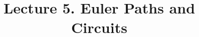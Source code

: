 \documentclass[aspectratio=169]{beamer}
\begin{document}
 

\newcommand{\Cov}{\mathrm{Cov}}
\newcommand{\Var}{\mathrm{Var}}
\newcommand{\brho}{\boldsymbol{\rho}}
\newcommand{\bSigma}{\boldsymbol{\Sigma}}
\newcommand{\btheta}{\boldsymbol{\theta}}
\newcommand{\bbeta}{\boldsymbol{\beta}}
\newcommand{\bmu}{\boldsymbol{\mu}}
\newcommand{\bW}{\mathbf{W}}
\newcommand{\one}{\mathbf{1}}
\newcommand{\bH}{\mathbf{H}}
\newcommand{\by}{\mathbf{y}}
\newcommand{\bolde}{\mathbf{e}}
\newcommand{\bx}{\mathbf{x}}

\newcommand{\cpp}[1]{\texttt{#1}}

\providecommand{\abs}[1]{\lvert#1\rvert}
\providecommand{\norm}[1]{\lVert#1\rVert}
\providecommand{\Blue}[1]{\textcolor{blue}{#1}}
\providecommand{\Red}[1]{\textcolor{red}{#1}}  
\providecommand{\Purple}[1]{\textcolor{purple}{#1}} %
\newcommand{\celsius}{\ensuremath{^\circ}C}
\newcommand\thfore{\mathord{\therefore}\,}

\title{Lecture 5. Euler Paths and Circuits}

\date{ }

\frame[plain]{\titlepage}
\end{document}
